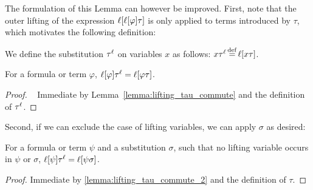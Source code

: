 The formulation of this Lemma can however be improved.
First, note that the outer lifting of the expression $\ell[\ell[\varphi]\tau]$ is only applied to terms introduced by $\tau$, which motivates the following definition:

\begin{defi}[$\tauell$]
	We define the substitution $\tauell$ on variables $x$ as follows: 
	$x\tauell \spas\defeq \lifboth{x\tau}$.
\end{defi}



\begin{lemma}
	\label{lemma:lifting_tau_commute_2}
	For a formula or term $\varphi$,
	$\ell[\varphi]\tau^\ell = \ell[\varphi\tau]$.
\end{lemma}
\begin{proof}~
	Immediate by Lemma~\ref{lemma:lifting_tau_commute} and the definition of $\tauell$.
\end{proof}

Second, if we can exclude the case of lifting variables, we can apply $\sigma$ as desired:
\begin{lemma}
	\label{lemma:lifting_tau_commute_2}
	For a formula or term $\psi$ and a substitution $\sigma$, such that no lifting variable occurs in $\psi$ or $\sigma$,
	$\ell[\psi]\tau^\ell = \ell[\psi\sigma]$.
\end{lemma}
\begin{proof}
	Immediate by \ref{lemma:lifting_tau_commute_2} and the definition of $\tau$.
\end{proof}












